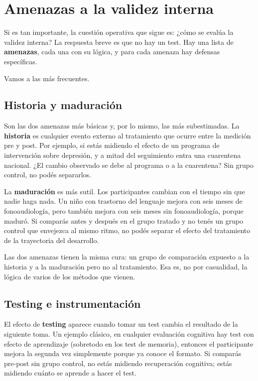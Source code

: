\documentclass[
  letterpaper,
  DIV=11,
  numbers=noendperiod,
  oneside]{scrreprt}
\begin{document}
\hypertarget{amenazas-a-la-validez-interna}{%
\section{Amenazas a la validez
interna}\label{amenazas-a-la-validez-interna}}

Si es tan importante, la cuestión operativa que sigue es: ¿cómo se
evalúa la validez interna? La respuesta breve es que no hay un test. Hay
una lista de \textbf{amenazas}, cada una con su lógica, y para cada
amenaza hay defensas específicas.

Vamos a las más frecuentes.

\hypertarget{historia-y-maduraciuxf3n}{%
\subsection{Historia y maduración}\label{historia-y-maduraciuxf3n}}

Son las dos amenazas más básicas y, por lo mismo, las más subestimadas.
La \textbf{historia} es cualquier evento externo al tratamiento que
ocurre entre la medición pre y post. Por ejemplo, si estás midiendo el
efecto de un programa de intervención sobre depresión, y a mitad del
seguimiento entra una cuarentena nacional. ¿El cambio observado se debe
al programa o a la cuarentena? Sin grupo control, no podés separarlos.

La \textbf{maduración} es más sutil. Los participantes cambian con el
tiempo sin que nadie haga nada. Un niño con trastorno del lenguaje
mejora con seis meses de fonoaudiología, pero también mejora con seis
meses sin fonoaudiología, porque maduró. Si comparás antes y después en
el grupo tratado y no tenés un grupo control que envejezca al mismo
ritmo, no podés separar el efecto del tratamiento de la trayectoria del
desarrollo.

Las dos amenazas tienen la misma cura: un grupo de comparación expuesto
a la historia y a la maduración pero no al tratamiento. Esa es, no por
casualidad, la lógica de varios de los métodos que vienen.

\hypertarget{testing-e-instrumentaciuxf3n}{%
\subsection{Testing e
instrumentación}\label{testing-e-instrumentaciuxf3n}}

El efecto de \textbf{testing} aparece cuando tomar un test cambia el
resultado de la siguiente toma. Un ejemplo clásico, en cualquier
evaluación cognitiva hay test con efecto de aprendizaje (sobretodo en
los test de memoria), entonces el participante mejora la segunda vez
simplemente porque ya conoce el formato. Si comparás pre-post sin grupo
control, no estás midiendo recuperación cognitiva; estás midiendo cuánto
se aprende a hacer el test.
\end{document}
